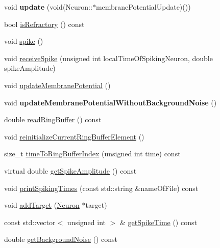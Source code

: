 \begin{DoxyCompactItemize}
\item 
\hypertarget{classNeuron_a521a967d65a078140cc9c6b8d30240ce}{void {\bfseries update} (void(Neuron\-::$\ast$membrane\-Potential\-Update)())}\label{classNeuron_a521a967d65a078140cc9c6b8d30240ce}

\item 
bool \hyperlink{classNeuron_aa40fbb2b025efb1db420da32e16741c1}{is\-Refractory} () const 
\item 
void \hyperlink{classNeuron_a955ecfd2984f75c18664bd370c34af1d}{spike} ()
\item 
void \hyperlink{classNeuron_aa8111a347de6ddfb6c799bdcd3092cb7}{receive\-Spike} (unsigned int local\-Time\-Of\-Spiking\-Neuron, double spike\-Amplitude)
\item 
void \hyperlink{classNeuron_a41a81d8527734e59bae39f73fece887f}{update\-Membrane\-Potential} ()
\item 
\hypertarget{classNeuron_a2a3d0130b76a6e1daa0191b97718178b}{void {\bfseries update\-Membrane\-Potential\-Without\-Background\-Noise} ()}\label{classNeuron_a2a3d0130b76a6e1daa0191b97718178b}

\item 
double \hyperlink{classNeuron_a763493ef8eff51a638cbb75f0983b828}{read\-Ring\-Buffer} () const 
\item 
void \hyperlink{classNeuron_a41dd9577d84a48bd427201b4b8234150}{reinitialize\-Current\-Ring\-Buffer\-Element} ()
\item 
size\-\_\-t \hyperlink{classNeuron_af1c7b80b5e70e906734ce710d37b1fd7}{time\-To\-Ring\-Buffer\-Index} (unsigned int time) const 
\item 
virtual double \hyperlink{classNeuron_aec2283fbfaba764cd088e6d16b0a74bb}{get\-Spike\-Amplitude} () const 
\item 
void \hyperlink{classNeuron_a15b3eaa67535301e011d5cd8d53a61d1}{print\-Spiking\-Times} (const std\-::string \&name\-Of\-File) const 
\item 
void \hyperlink{classNeuron_a9bf071c800e76fa7fbd611cee7cd76d6}{add\-Target} (\hyperlink{classNeuron}{Neuron} $\ast$target)
\item 
const std\-::vector$<$ unsigned int $>$ \& \hyperlink{classNeuron_ae87bb09d99e4e9c2185be8b73fc242ba}{get\-Spike\-Time} () const 
\item 
double \hyperlink{classNeuron_a5487631e8982ae2368da0917535a9001}{get\-Background\-Noise} () const 
\end{DoxyCompactItemize}
